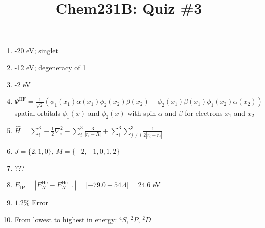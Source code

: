 \documentclass{article}
\title{Chem231B: Quiz \#3} %
\begin{document}
\maketitle

\begin{enumerate}
\item -20 eV; singlet
\item -12 eV; degeneracy of 1
\item -2 eV
\item $\Psi^{\text{HF}} = \frac{1}{\sqrt{2}}(\phi_1(x_1)
  \alpha(x_1)\phi_2(x_2)\beta(x_2) - \phi_2(x_1)\beta(x_1)
  \phi_1(x_2)\alpha(x_2))$ \\
  spatial orbitals $\phi_1(x)$ and $\phi_2(x)$ with
  spin $\alpha$ and $\beta$ for electrons $x_1$ and $x_2$
\item $\hat{H} = \sum_i^3 - \frac{1}{2}\nabla_i^2
  -\sum_i^3\frac{3}{|r_i-R|} + \sum_i^3\sum_{j\neq i}^3
  \frac{1}{2|r_i-r_j|}$
\item $J = \{2,1,0\}$, $M = \{-2,-1,0,1,2\}$
\item ???
\item $E_{\text{IP}} = |E_N^{\text{He}} - E_{N-1}^{\text{He}}|
  = |-79.0 + 54.4| = 24.6$ eV
\item $1.2\%$ Error
\item From lowest to highest in energy: $^4S$, $^2P$, $^2D$
\end{enumerate}
  
  
  
\end{document}
